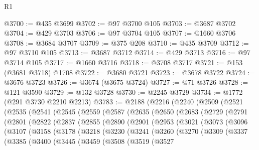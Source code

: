 \begin{lexlean}{R1}
\begin{coremodule}
@3700 := @435 @3699
@3702 := @97 @3700 @105
@3703 := @3687 @3702
@3704 := @429 @3703
@3706 := @97 @3704 @105
@3707 := @1660 @3706
@3708 := @3684 @3707
@3709 := @375 @208
@3710 := @435 @3709
@3712 := @97 @3710 @105
@3713 := @3687 @3712
@3714 := @429 @3713
@3716 := @97 @3714 @105
@3717 := @1660 @3716
@3718 := @3708 @3717
@3721 := @153 (@3681 @3718) @1708
@3722 := @3680 @3721
@3723 := @3678 @3722
@3724 := @3676 @3723
@3726 := @3674 (@3675 @3724)
@3727 := @71 @3726
@3728 := @121 @3590
@3729 := @132 @3728
@3730 := @2245 @3729
@3734 := @1772 (@291 @3730 @2210 @2213)
@3783 := @2188
    (@2216
      (@2240
        (@2509
          (@2521
            (@2535
              (@2541
                (@2545
                  (@2559
                    (@2587
                      (@2635
                        (@2650
                          (@2683
                            (@2729
                              (@2791
                                (@2801
                                  (@2822
                                    (@2837
                                      (@2855
                                        (@2890
                                          (@2901
                                            (@2953
                                              (@3021
                                                (@3073
                                                  (@3096
                                                    (@3107
                                                      (@3158
                                                        (@3178
                                                          (@3218
                                                            (@3230
                                                              (@3241
                                                                (@3260
                                                                  (@3270
                                                                    (@3309
                                                                      (@3337
                                                                        (@3385
                                                                          (@3400
                                                                            (@3445
                                                                              (@3459
                                                                                (@3508
                                                                                  (@3519
                                                                                    (@3527

\end{coremodule}
\end{lexlean}
